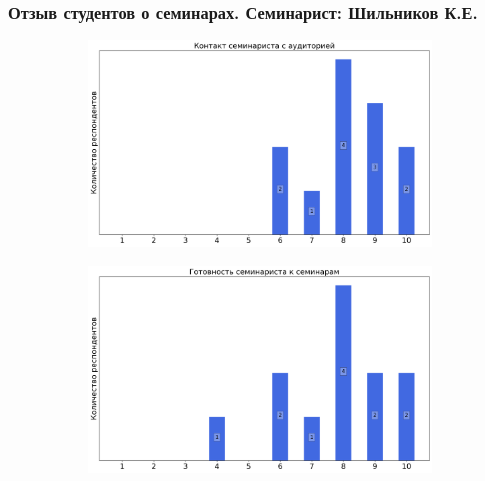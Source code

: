     \subsubsection{Отзыв студентов о семинарах. Семинарист: Шильников К.Е.}
        \begin{figure}[H]
            \centering
            \begin{subfigure}[b]{0.45\textwidth}
                \centering
                \includegraphics[width=\textwidth]{images/3 course/Вычислительная математика/seminarists-marks-Шильников К.Е.-0.png}
            \end{subfigure}
            \begin{subfigure}[b]{0.45\textwidth}
                \centering
                \includegraphics[width=\textwidth]{images/3 course/Вычислительная математика/seminarists-marks-Шильников К.Е.-1.png}
            \end{subfigure}
            \begin{subfigure}[b]{0.45\textwidth}
                \centering

\end{subfigure}
\end{figure}
